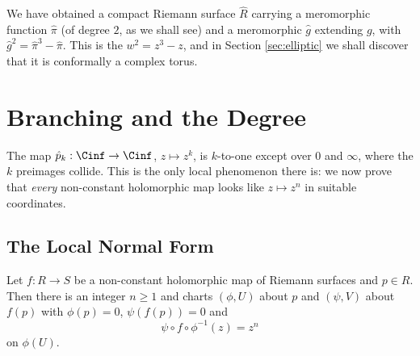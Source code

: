 We have obtained a compact Riemann surface $\hat R$ carrying a meromorphic function
$\hat\pi$ (of degree $2$, as we shall see) and a meromorphic $\hat g$ extending $g$, with
$\hat g^2 = \hat\pi^3 - \hat\pi$. This is the  $w^2 = z^3 - z$, and
in Section \ref{sec:elliptic} we shall discover that it is conformally a complex torus.

\section{Branching and the Degree}\label{sec:branching}

The map $\hat p_k : \Cinf \to \Cinf$, $z \mapsto z^k$, is $k$-to-one except over $0$ and
$\infty$, where the $k$ preimages collide. This is the only local phenomenon there is: we
now prove that \emph{every} non-constant holomorphic map looks like $z \mapsto z^n$ in
suitable coordinates.

\subsection{The Local Normal Form}

\begin{proposition}\label{prop:localform}
	Let $f : R \to S$ be a non-constant holomorphic map of Riemann surfaces and $p \in R$.
	Then there is an integer $n \geq 1$ and charts $(\phi, U)$ about $p$ and $(\psi, V)$
	about $f(p)$ with $\phi(p) = 0$, $\psi(f(p)) = 0$ and
	$$
	\psi \circ f \circ \phi^{-1}(z) = z^n
	$$
	on $\phi(U)$.
\end{proposition}

